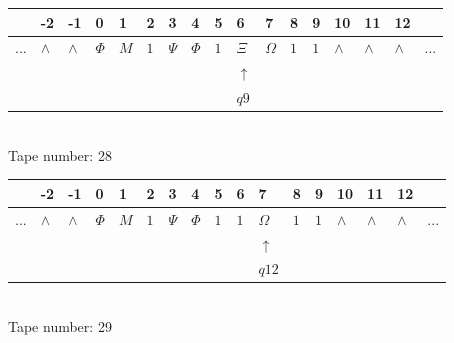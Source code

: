 \documentclass[11pt]{article}
\begin{document}
\begin{table}[H]
\centering
\begin{tabular}{lllllllllllllllll}
 & -2 & -1 & 0 & 1 & 2 & 3 & 4 & 5 & 6 & 7 & 8 & 9 & 10 & 11 & 12 & \\
\hline
$...$ & \multicolumn{1}{|l|}{$\wedge$} & \multicolumn{1}{|l|}{$\wedge$} & \multicolumn{1}{|l|}{$\Phi$} & \multicolumn{1}{|l|}{$M$} & \multicolumn{1}{|l|}{$1$} & \multicolumn{1}{|l|}{$\Psi$} & \multicolumn{1}{|l|}{$\Phi$} & \multicolumn{1}{|l|}{$1$} & \multicolumn{1}{|l|}{$\Xi$} & \multicolumn{1}{|l|}{$\Omega$} & \multicolumn{1}{|l|}{$1$} & \multicolumn{1}{|l|}{$1$} & \multicolumn{1}{|l|}{$\wedge$} & \multicolumn{1}{|l|}{$\wedge$} & \multicolumn{1}{|l|}{$\wedge$} & $...$\\
\hline
&  &  &  &  &  &  &  &  & $\uparrow$ &  &  &  &  &  &  &  \\
&  &  &  &  &  &  &  &  & $ q9 $ &  &  &  &  &  &  &  \\
\end{tabular}
\\
Tape number: 28
\noindent\makebox[\linewidth]{\hdashrule{\textwidth}{1pt}{1pt}}\end{table}

\begin{table}[H]
\centering
\begin{tabular}{lllllllllllllllll}
 & -2 & -1 & 0 & 1 & 2 & 3 & 4 & 5 & 6 & 7 & 8 & 9 & 10 & 11 & 12 & \\
\hline
$...$ & \multicolumn{1}{|l|}{$\wedge$} & \multicolumn{1}{|l|}{$\wedge$} & \multicolumn{1}{|l|}{$\Phi$} & \multicolumn{1}{|l|}{$M$} & \multicolumn{1}{|l|}{$1$} & \multicolumn{1}{|l|}{$\Psi$} & \multicolumn{1}{|l|}{$\Phi$} & \multicolumn{1}{|l|}{$1$} & \multicolumn{1}{|l|}{$1$} & \multicolumn{1}{|l|}{$\Omega$} & \multicolumn{1}{|l|}{$1$} & \multicolumn{1}{|l|}{$1$} & \multicolumn{1}{|l|}{$\wedge$} & \multicolumn{1}{|l|}{$\wedge$} & \multicolumn{1}{|l|}{$\wedge$} & $...$\\
\hline
&  &  &  &  &  &  &  &  &  & $\uparrow$ &  &  &  &  &  &  \\
&  &  &  &  &  &  &  &  &  & $ q12 $ &  &  &  &  &  &  \\
\end{tabular}
\\
Tape number: 29
\noindent\makebox[\linewidth]{\hdashrule{\textwidth}{1pt}{1pt}}\end{table}
\clearpage
\end{document}
